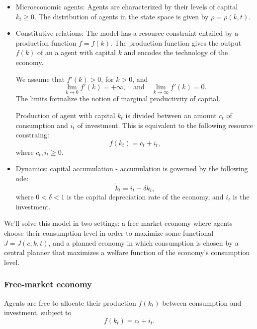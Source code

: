 \documentclass{article}
\begin{document}
\begin{itemize}
    \item Microeconomic agents: Agents are characterized by their levels of capital $k_t \geq 0$. The 
    distribution of agents in the state space is given by $\rho = \rho(k,t)$.
    \item Constitutive relations: The model has a resource constraint entailed by a production function
    $f = f(k)$. The production function gives the output $f(k)$ of an a agent with capital $k$ and 
    encodes the technology of the economy.

    We assume that $f'(k) > 0$, for $k >0 $, and 
    $$
    \lim_{k \to 0} f'(k) = +\infty,\quad \text{and} \quad \lim_{k\to \infty} f'(k) = 0.
    $$
    The limits formalize the notion of marginal productivity of capital.

    Production of agent with capital $k_t$ is divided between an amount $c_t$ of consumption and $i_t$ of 
    investment. This is equivalent to the following resource constraing:
    $$
    f(k_t) = c_t + i_t,
    $$ 
    where $c_t, i_t \geq 0$.
    \item  Dynamics: capital accumulation - accumulation is governed by the following ode:
    $$
    \dot k_t = i_t - \delta k_t,
    $$
    where $0 < \delta < 1$ is the capital depreciation rate of the economy, and $i_t$ is the investment.
\end{itemize}

We'll solve this model in two settings: a free market economy where agents choose their consumption level
in order to maximize some functional $J = J(c,k,t)$, and a planned economy in which consumption is chosen
by a central planner that maximizes a welfare function of the economy's consumption level.

\subsubsection{Free-market economy}

Agents are free to allocate their production $f(k_t)$ between consumption and investment, subject to 
$$ f(k_t) = c_t + i_t. $$
\end{document}
